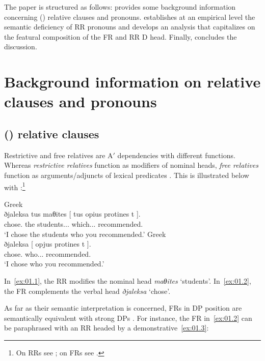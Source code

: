 \documentclass[output=paper]{langsci/langscibook}
\begin{document}
The paper is structured as follows:  provides some
background information concerning () relative clauses and pronouns.
 establishes at an empirical level the semantic deficiency
of \gls{RR} pronouns and  develops an analysis that
capitalizes on the featural composition of the \gls{FR} and \gls{RR} D head.
Finally,  concludes the discussion.

\section{Background information on relative clauses and
pronouns}\label{sec:01.2}

\subsection{() relative clauses}\label{sub:01.2.1}

Restrictive and free relatives are A$'$  dependencies with
different functions. Whereas \emph{restrictive relatives} function as modifiers of
nominal heads, \emph{free relatives} function as arguments/adjuncts of lexical
predicates \parencite{AleLawMeiWil2000,Bianchi2002,GroLan1998}.  This is
illustrated below with :\footnote{On  \glspl{RR} see
\citet{Alexopoulou2006}; on  \glspl{FR} see \textcite{AleVar1997}.}

\ea Greek\label{ex:01.1}\\
	\gll ðjaleksa tus maθites [ {tus opius} protines t ].\\
        chose.\Fsg{} the students.\M.\Pl.\Acc{} {} which.\M.\Pl.\Acc{} recommended.\Ssg{} {}\\
	\glt ‘I chose the students who you recommended.'
\ex Greek\label{ex:01.2}\\
	\gll ðjaleksa [ opjus protines t ].\\
        chose.\Fsg{} {} who.\M.\Pl.\Acc{} recommended.\Ssg{} {}\\
	\glt \enquote*{I chose who you recommended.}
\z

In~\eqref{ex:01.1}, the \gls{RR} modifies the nominal head \emph{maθites}
‘students’. In~\eqref{ex:01.2}, the \gls{FR} complements the verbal head \emph{ðjaleksa}
‘chose’.

As far as their semantic interpretation is concerned, \glspl{FR} in DP position
are semantically equivalent with strong DPs \citep{Jacobson1995}. For instance,
the \gls{FR} in~\eqref{ex:01.2} can be paraphrased with an \gls{RR} headed
by a demonstrative~\eqref{ex:01.3}:
\end{document}
